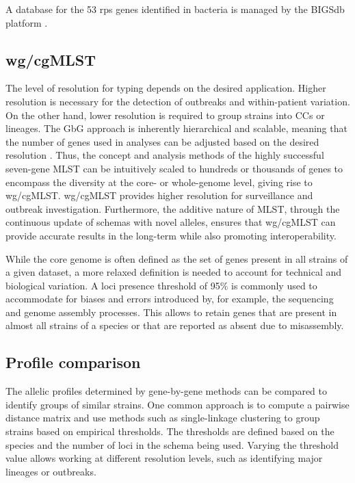 A database for the 53 \ac{rps} genes identified in bacteria is managed by the \ac{BIGSdb} platform \cite{maiden_mlst_2013}.

\subsection{wg/cgMLST}

The level of resolution for typing depends on the desired application. Higher resolution is necessary for the detection of outbreaks and within-patient variation. On the other hand, lower resolution is required to group strains into \ac{CC}s or lineages. The \ac{GbG} approach is inherently hierarchical and scalable, meaning that the number of genes used in analyses can be adjusted based on the desired resolution \cite{maiden_mlst_2013}. Thus, the concept and analysis methods of the highly successful seven-gene \ac{MLST} can be intuitively scaled to hundreds or thousands of genes to encompass the diversity at the core- or whole-genome level, giving rise to \ac{wg/cgMLST}. \ac{wg/cgMLST} provides higher resolution for surveillance and outbreak investigation. Furthermore, the additive nature of \ac{MLST}, through the continuous update of schemas with novel alleles, ensures that wg/cgMLST can provide accurate results in the long-term while also promoting interoperability.

While the core genome is often defined as the set of genes present in all strains of a given dataset, a more relaxed definition is needed to account for technical and biological variation. A loci presence threshold of 95\% is commonly used to accommodate for biases and errors introduced by, for example, the sequencing and genome assembly processes. This allows to retain genes that are present in almost all strains of a species or that are reported as absent due to misassembly.

\subsection{Profile comparison}

The allelic profiles determined by gene-by-gene methods can be compared to identify groups of similar strains. One common approach is to compute a pairwise distance matrix and use methods such as single-linkage clustering to group strains based on empirical thresholds. The thresholds are defined based on the species and the number of loci in the schema being used. Varying the threshold value allows working at different resolution levels, such as identifying major lineages or outbreaks.


